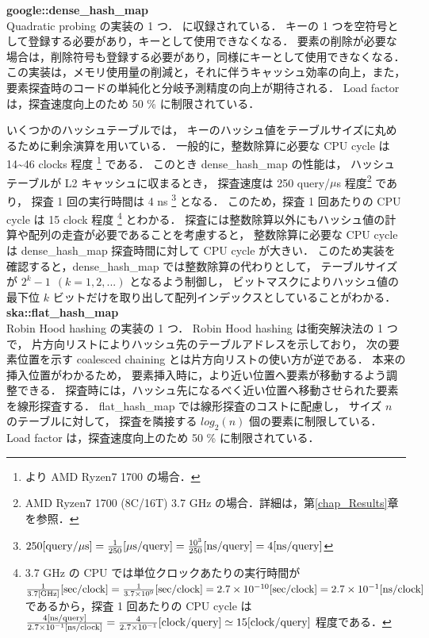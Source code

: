 {\bf google::dense\_hash\_map}
\samepage \\ \indent
Quadratic probing の実装の 1 つ．
\cite{sparsehash2005}に収録されている．
キーの 1 つを空符号として登録する必要があり，キーとして使用できなくなる．
要素の削除が必要な場合は，削除符号も登録する必要があり，同様にキーとして使用できなくなる．
この実装は，メモリ使用量の削減と，それに伴うキャッシュ効率の向上，また，要素探査時のコードの単純化と分岐予測精度の向上が期待される．
Load factor は，探査速度向上のため 50 \% に制限されている．

いくつかのハッシュテーブルでは，
キーのハッシュ値をテーブルサイズに丸めるために剰余演算を用いている．
一般的に，整数除算に必要な CPU cycle は 14\textasciitilde 46 clocks 程度
\footnote{
  \cite{AgnerFog2018}より AMD Ryzen7 1700 の場合．
} である．
このとき dense\_hash\_map の性能は，
ハッシュテーブルが L2 キャッシュに収まるとき，
探査速度は 250 query/$\mu$s 程度\footnote{AMD Ryzen7 1700 (8C/16T) 3.7 GHz の場合．詳細は，第\ref{chap_Results}章を参照．} であり，
探査 1 回の実行時間は 4 ns
\footnote{
  $
    250{\rm [query \slash \mu s]}
    = \frac{1}{250} {\rm [\mu s \slash query]}
    = \frac{10^3}{250} {\rm [ns \slash query]}
    = 4 {\rm [ns \slash query]}
  $
} となる．
このため，探査 1 回あたりの CPU cycle は 15 clock 程度
\footnote{
  3.7 GHz の CPU では単位クロックあたりの実行時間が
  $
    \frac{1}{3.7 {\rm [GHz]}}{\rm [sec/clock]}
    = \frac{1}{3.7 \times 10^9}{\rm [sec/clock]}
    = 2.7 \times 10^{-10}{\rm [sec/clock]}
    = 2.7 \times 10^{-1}{\rm [ns/clock]}
  $
  であるから，探査 1 回あたりの CPU cycle は
  $
    \frac{ 4 {\rm [ns/query]} }{ 2.7 \times 10^{-1} {\rm [ns/clock]} }
    = \frac{ 4 }{ 2.7 \times 10^{-1} } {\rm [clock/query]}
    \simeq 15 {\rm [clock/query]}
  $
  程度である．
} とわかる．
探査には整数除算以外にもハッシュ値の計算や配列の走査が必要であることを考慮すると，
整数除算に必要な CPU cycle は dense\_hash\_map 探査時間に対して CPU cycle が大きい．
このため実装を確認すると，dense\_hash\_map では整数除算の代わりとして，
テーブルサイズが $2^k-1\ \ (k=1,2,...)$ となるよう制御し，
ビットマスクによりハッシュ値の最下位 $k$ ビットだけを取り出して配列インデックスとしていることがわかる．
\\

{\bf ska::flat\_hash\_map}
\samepage \\ \indent
Robin Hood hashing の実装の 1 つ．
Robin Hood hashing は衝突解決法の 1 つで，
片方向リストによりハッシュ先のテーブルアドレスを示しており，
次の要素位置を示す coalesced chaining とは片方向リストの使い方が逆である．
本来の挿入位置がわかるため，
要素挿入時に，より近い位置へ要素が移動するよう調整できる．
探査時には，ハッシュ先になるべく近い位置へ移動させられた要素を線形探査する．
flat\_hash\_map では線形探査のコストに配慮し，
サイズ $n$ のテーブルに対して，
探査を隣接する $log_2(n)$ 個の要素に制限している\citep{Skarupke2017}．
Load factor は，探査速度向上のため 50 \% に制限されている．

